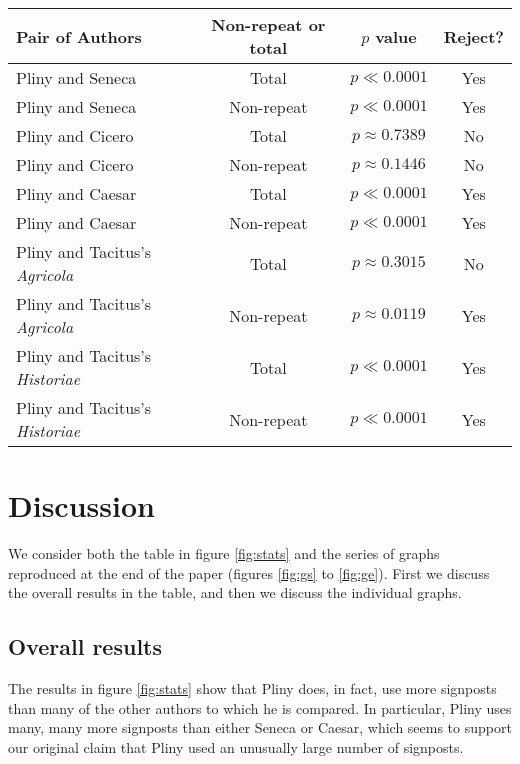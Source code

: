 \begin{figure*}[t]
  \begin{center}
    \begin{tabular}{| l | c | c | c |}
      \hline
      Pair of Authors & Non-repeat or total & $p$ value & Reject? \\ \hline \hline
      Pliny and Seneca & Total & $p \ll 0.0001$ & Yes \\ \hline
      Pliny and Seneca & Non-repeat & $p \ll 0.0001$ & Yes \\ \hline
      Pliny and Cicero & Total & $p \approx 0.7389$ & No \\ \hline
      Pliny and Cicero & Non-repeat & $p \approx 0.1446$ & No \\ \hline
      Pliny and Caesar & Total & $p \ll 0.0001$ & Yes \\ \hline
      Pliny and Caesar & Non-repeat & $p \ll 0.0001$ & Yes \\ \hline
      Pliny and Tacitus's \textit{Agricola} & Total & $p \approx 0.3015$ & No \\ \hline
      Pliny and Tacitus's \textit{Agricola} & Non-repeat & $p \approx 0.0119$ & Yes \\ \hline
      Pliny and Tacitus's \textit{Historiae} & Total & $p \ll 0.0001$ & Yes \\ \hline
      Pliny and Tacitus's \textit{Historiae} & Non-repeat & $p \ll 0.0001$ & Yes \\      
      \hline
    \end{tabular}
  \end{center}
  \caption{\label{fig:stats}The results of the statistical analysis desrcibed in section \ref{sec:stats}.}
\end{figure*}

\section{Discussion}
\label{sec:discuss}

We consider both the table in figure \ref{fig:stats} and the series of graphs reproduced at the end of the paper (figures \ref{fig:gs} to \ref{fig:ge}). First we discuss the overall results in the table, and then we discuss the individual graphs.

\subsection{Overall results}

The results in figure \ref{fig:stats} show that Pliny does, in fact, use more signposts than many of the other authors to which he is compared. In particular, Pliny uses many, many more signposts than either Seneca or Caesar, which seems to support our original claim that Pliny used an unusually large number of signposts.

